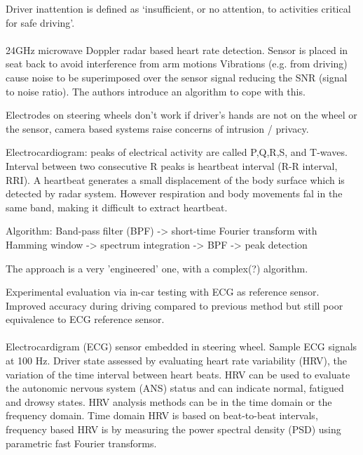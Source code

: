 \documentclass[11pt, parskip=half*,twoside=false]{scrbook}
\begin{document}
Driver inattention is defined as `insufficient, or no attention, to activities critical for safe driving'.

\paragraph{\citep{tsuchiyaHeartbeatDetectionTechnology2020}} 24GHz microwave Doppler radar based heart rate detection. Sensor is placed in seat back to avoid interference from arm motions  Vibrations (e.g. from driving) cause noise to be superimposed over the sensor signal reducing the SNR (signal to noise ratio). The authors introduce an algorithm to cope with this. 

Electrodes on steering wheels don't work if driver's hands are not on the wheel or the sensor, camera based systems raise concerns of intrusion / privacy. 

Electrocardiogram: peaks of electrical activity are called P,Q,R,S, and T-waves. Interval between two consecutive R peaks is heartbeat interval (R-R interval, RRI). A heartbeat generates a small displacement of the body surface which is detected by radar system. However  respiration and body movements fal in the same band, making it difficult to extract heartbeat.

Algorithm: Band-pass filter (BPF) -> short-time Fourier transform with Hamming window -> spectrum integration -> BPF -> peak detection

The approach is a very 'engineered' one, with a complex(?) algorithm. 

Experimental evaluation via in-car testing with ECG as reference sensor. Improved accuracy during driving compared to previous method but still poor equivalence to ECG reference sensor.

\paragraph{\citep{jungDriverFatigueDrowsiness2014}} Electrocardigram (ECG) sensor embedded in steering wheel. Sample ECG signals at 100 Hz. Driver state assessed by evaluating heart rate variability (HRV), the variation of the time interval between heart beats. HRV can be used to evaluate the autonomic nervous system (ANS) status and can indicate normal, fatigued and drowsy states. HRV analysis methods can be in the time domain or the frequency domain. Time domain HRV is based on beat-to-beat intervals, frequency based HRV is by measuring the power spectral density (PSD) using parametric fast Fourier transforms.
\end{document}
